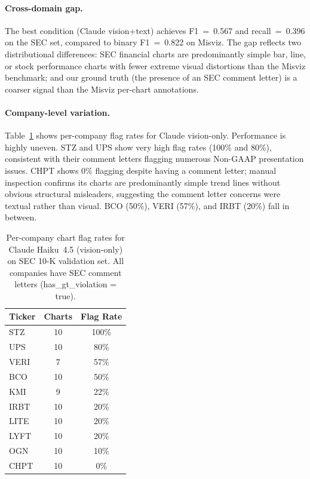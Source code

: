 \paragraph{Cross-domain gap.}
The best condition (Claude vision+text) achieves F1~=~0.567 and recall~=~0.396 on the SEC set, compared to binary F1~=~0.822 on Misviz. The gap reflects two distributional differences: SEC financial charts are predominantly simple bar, line, or stock performance charts with fewer extreme visual distortions than the Misviz benchmark; and our ground truth (the presence of an SEC comment letter) is a coarser signal than the Misviz per-chart annotations.

\paragraph{Company-level variation.}
Table~\ref{tab:sec_ticker} shows per-company flag rates for Claude vision-only. Performance is highly uneven. STZ and UPS show very high flag rates (100\% and 80\%), consistent with their comment letters flagging numerous Non-GAAP presentation issues. CHPT shows 0\% flagging despite having a comment letter; manual inspection confirms its charts are predominantly simple trend lines without obvious structural misleaders, suggesting the comment letter concerns were textual rather than visual. BCO (50\%), VERI (57\%), and IRBT (20\%) fall in between.

\begin{table}[h]
  \centering
  \caption{Per-company chart flag rates for Claude Haiku~4.5 (vision-only) on SEC 10-K validation set. All companies have SEC comment letters (has\_gt\_violation = true).}
  \label{tab:sec_ticker}
  \small
  \begin{tabular}{lcc}
    \toprule
    Ticker & Charts & Flag Rate \\
    \midrule
    STZ   & 10 & 100\% \\
    UPS   & 10 &  80\% \\
    VERI  &  7 &  57\% \\
    BCO   & 10 &  50\% \\
    KMI   &  9 &  22\% \\
    IRBT  & 10 &  20\% \\
    LITE  & 10 &  20\% \\
    LYFT  & 10 &  20\% \\
    OGN   & 10 &  10\% \\
    CHPT  & 10 &   0\% \\
    \bottomrule
  \end{tabular}
\end{table}

